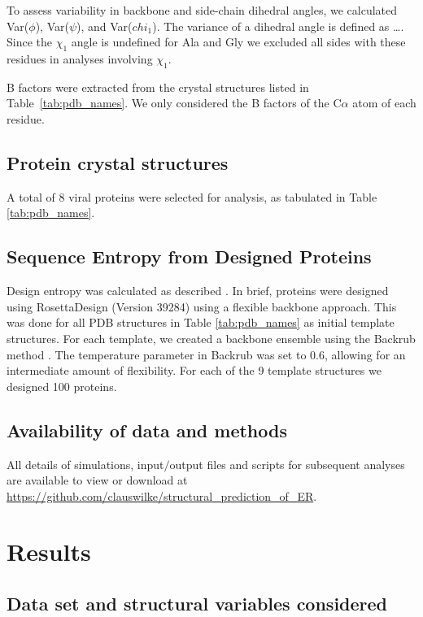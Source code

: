 \documentclass[12pt]{article}
\begin{document}
To assess variability in backbone and side-chain dihedral angles, we calculated Var($\phi$), Var($\psi$), and Var($chi_1$). {\color{red}The variance of a dihedral angle is defined as \dots.} Since the $\chi_1$ angle is undefined for Ala and Gly we excluded all sides with these residues in analyses involving $\chi_1$.

B factors were extracted from the crystal structures listed in Table~\ref{tab:pdb_names}. We only considered the B factors of the C$\alpha$ atom of each residue.

\subsection*{Protein crystal structures}
	
A total of $8$ viral proteins were selected for analysis, as tabulated in Table \ref{tab:pdb_names}.

\subsection*{Sequence Entropy from Designed Proteins}

Design entropy was calculated as described \citep{Jacksonetal2013}. In brief, proteins were designed using RosettaDesign (Version 39284) \citep{LeaverFayetal2011} using a flexible backbone approach. This was done for all PDB structures in Table \ref{tab:pdb_names} as initial template structures. For each template, we created a backbone ensemble using the Backrub method \citep{Smith2008}. The temperature parameter in Backrub was set to 0.6, allowing for an intermediate amount of flexibility.  For each of the 9 template structures we designed 100 proteins.

\subsection*{Availability of data and methods}

All details of simulations, input$/$output files and scripts for subsequent analyses are available to view or download at \url{https://github.com/clauswilke/structural\_prediction\_of\_ER}.

\section*{Results}

\subsection*{Data set and structural variables considered}
\end{document}
